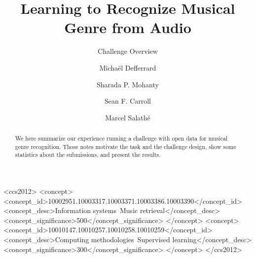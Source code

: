 \documentclass[sigconf]{acmart}
\begin{document}
\title{Learning to Recognize Musical Genre from Audio}
\subtitle{Challenge Overview}


\author{Michaël Defferrard}

\author{Sharada P. Mohanty}

\author{Sean F. Carroll}

\author{Marcel Salathé}



\begin{abstract}
	We here summarize our experience running a challenge with open data for musical genre recognition. Those notes motivate the task and the challenge design, show some statistics about the submissions, and present the results.
\end{abstract}


 \begin{CCSXML}
<ccs2012>
  <concept>
    <concept_id>10002951.10003317.10003371.10003386.10003390</concept_id>
    <concept_desc>Information systems~Music retrieval</concept_desc>
    <concept_significance>500</concept_significance>
  </concept>
  <concept>
    <concept_id>10010147.10010257.10010258.10010259</concept_id>
    <concept_desc>Computing methodologies~Supervised learning</concept_desc>
    <concept_significance>300</concept_significance>
  </concept>
</ccs2012>
\end{CCSXML}
\end{document}
